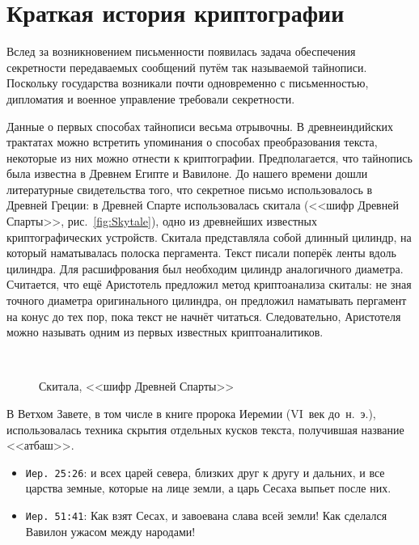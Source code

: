 \chapter{Краткая история криптографии}

Вслед за возникновением письменности появилась задача обеспечения секретности передаваемых сообщений путём так называемой тайнописи. Поскольку государства возникали почти одновременно с письменностью, дипломатия и военное управление требовали секретности.

Данные о первых способах тайнописи весьма отрывочны. В древнеиндийских трактатах можно встретить упоминания о способах преобразования текста, некоторые из них можно отнести к криптографии. Предполагается, что тайнопись была известна в Древнем Египте и Вавилоне. До нашего времени дошли литературные свидетельства того, что секретное письмо использовалось в Древней Греции: в Древней Спарте использовалась скитала (<<шифр Древней Спарты>>, рис.~\ref{fig:Skytale}), одно из древнейших известных криптографических устройств. Скитала представляла собой длинный цилиндр, на который наматывалась полоска пергамента. Текст писали поперёк ленты вдоль цилиндра. Для расшифрования был необходим цилиндр аналогичного диаметра. Считается, что ещё Аристотель предложил метод криптоанализа скиталы: не зная точного диаметра оригинального цилиндра, он предложил наматывать пергамент на конус до тех пор, пока текст не начнёт читаться. Следовательно, Аристотеля можно называть одним из первых известных криптоаналитиков.

\begin{figure}[t]
	\centering
	~~
	\caption{Скитала, <<шифр Древней Спарты>>}
\end{figure}

В Ветхом Завете, в том числе в книге пророка Иеремии (VI~век до~н.~э.), использовалась техника скрытия отдельных кусков текста, получившая название <<атбаш>>.

\begin{itemize}
	\item \texttt{Иер. 25:26}: и всех царей севера, близких друг к другу и дальних, и все царства земные, которые на лице земли, а царь Сесаха выпьет после них.
	\item \texttt{Иер. 51:41}: Как взят Сесах, и завоевана слава всей земли! Как сделался Вавилон ужасом между народами!
\end{itemize}

